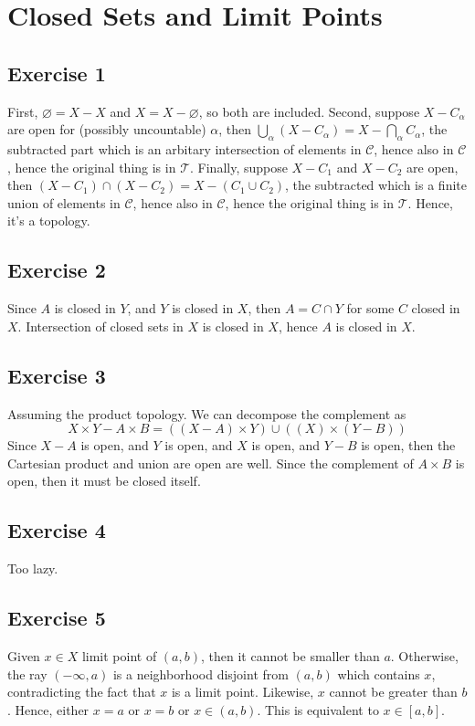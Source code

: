 \documentclass{book}
\begin{document}
\section{Closed Sets and Limit Points}

\subsection*{Exercise 1}
First, $\varnothing = X - X$ and $X = X - \varnothing$, so both are included. Second, suppose $X - C_\alpha$ are open for (possibly uncountable) $\alpha$, then $\bigcup_\alpha (X - C_\alpha) = X - \bigcap_\alpha C_\alpha$, the subtracted part which is an arbitary intersection of elements in $\mathcal{C}$, hence also in $\mathcal{C}$, hence the original thing is in $\mathcal{T}$. Finally, suppose $X - C_1$ and $X - C_2$ are open, then $(X - C_1) \cap (X - C_2) = X - (C_1 \cup C_2)$, the subtracted which is a finite union of elements in $\mathcal{C}$, hence also in $\mathcal{C}$, hence the original thing is in $\mathcal{T}$. Hence, it's a topology.

\subsection*{Exercise 2}
Since $A$ is closed in $Y$, and $Y$ is closed in $X$, then $A = C \cap Y$ for some $C$ closed in $X$. Intersection of closed sets in $X$ is closed in $X$, hence $A$ is closed in $X$.

\subsection*{Exercise 3}
Assuming the product topology. We can decompose the complement as
$$X \times Y - A \times B = ((X - A) \times Y) \cup ((X) \times (Y - B))$$
Since $X - A$ is open, and $Y$ is open, and $X$ is open, and $Y - B$ is open, then the Cartesian product and union are open are well. Since the complement of $A \times B$ is open, then it must be closed itself.

\subsection*{Exercise 4}
Too lazy.

\subsection*{Exercise 5}
Given $x \in X$ limit point of $(a, b)$, then it cannot be smaller than $a$. Otherwise, the ray $(-\infty, a)$ is a neighborhood disjoint from $(a, b)$ which contains $x$, contradicting the fact that $x$ is a limit point. Likewise, $x$ cannot be greater than $b$. Hence, either $x = a$ or $x = b$ or $x \in (a, b)$. This is equivalent to $x \in [a, b]$.
\end{document}
